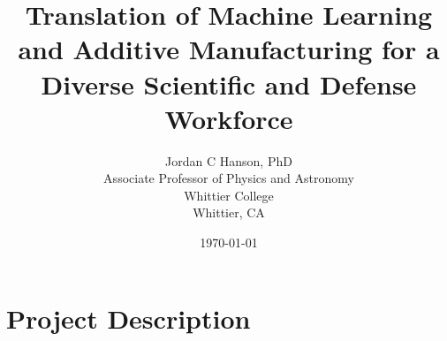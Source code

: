 \documentclass[10pt,twoside,openany]{book}
\title{Translation of Machine Learning and Additive Manufacturing for a Diverse Scientific and Defense Workforce}
\author{Jordan C Hanson, PhD \\ Associate Professor of Physics and Astronomy \\ Whittier College \\ Whittier, CA}
\date{\today}
\begin{document}
\begin{flushleft}

\end{flushleft}

\begin{flushleft}

\end{flushleft}

\maketitle
\tableofcontents

\chapter{Project Description}
\begin{flushleft}

\end{flushleft}

%
%
%
%
%
%
%

\small


 
\end{document}

